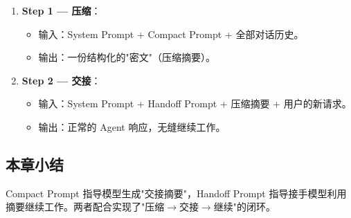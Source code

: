\begin{enumerate}
    \item \textbf{Step 1 — 压缩}：
    \begin{itemize}
        \item 输入：System Prompt + Compact Prompt + 全部对话历史。
        \item 输出：一份结构化的"密文"（压缩摘要）。
    \end{itemize}
    \item \textbf{Step 2 — 交接}：
    \begin{itemize}
        \item 输入：System Prompt + Handoff Prompt + 压缩摘要 + 用户的新请求。
        \item 输出：正常的 Agent 响应，无缝继续工作。
    \end{itemize}
\end{enumerate}

\subsection{本章小结}

Compact Prompt 指导模型生成"交接摘要"，Handoff Prompt 指导接手模型利用摘要继续工作。两者配合实现了"压缩$\rightarrow$交接$\rightarrow$继续"的闭环。


